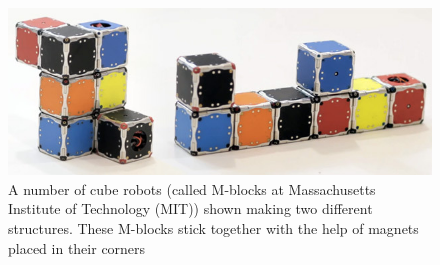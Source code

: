 \begin{figure}[H] 
	\centering
	\includegraphics[scale=0.4]{figures/m-blocks}
	\caption{A number of cube robots (called M-blocks at Massachusetts Institute of Technology (MIT)) shown making two different structures. These M-blocks stick together with the help of magnets placed in their corners\cite{LRosen}}
	\label{MBlocksExample}
\end{figure}